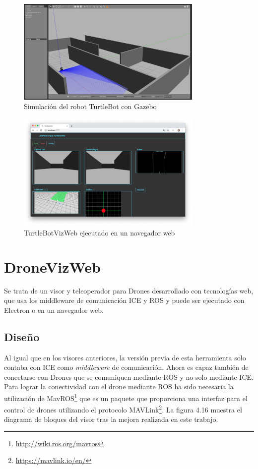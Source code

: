 \begin{figure}[H]
  \begin{center}
    \includegraphics[width=0.8\textwidth]{figures/gazeboturtle.png}
    		\caption{Simulación del robot TurtleBot con Gazebo}
		\label{fig.gazeboturtle}
		\end{center}
\end{figure}
\begin{figure}[H]
  \begin{center}
    \includegraphics[width=0.8\textwidth]{figures/TurtleBotviznode.png}
    		\caption{TurtleBotVizWeb ejecutado en un navegador web}
		\label{fig.TurtleBotviznode}
		\end{center}
\end{figure}

\section{DroneVizWeb}
Se trata de un visor y teleoperador para Drones desarrollado con tecnologías web, que usa los middleware de comunicación ICE y ROS y puede ser ejecutado con Electron o en un navegador web.

\subsection{Diseño}
Al igual que en los visores anteriores, la versión previa de esta herramienta solo contaba con ICE como \textit{middleware} de comunicación. Ahora es capaz también de conectarse con Drones que se comuniquen mediante ROS y no solo mediante ICE. Para lograr la conectividad con el drone mediante ROS ha sido necesaria la utilización de MavROS\footnote{\url{http://wiki.ros.org/mavros}} que es un paquete que proporciona una interfaz para el control de drones utilizando el protocolo MAVLink\footnote{\url{https://mavlink.io/en/}}. La figura 4.16 muestra el diagrama de bloques del visor tras la mejora realizada en este trabajo.

